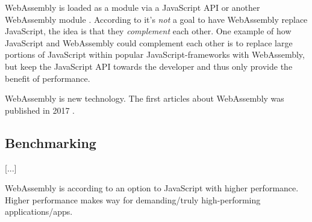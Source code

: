 WebAssembly is loaded as a module via a JavaScript API or another WebAssembly module \parencite{HaasRossbergSchuffTitzerHolmanGohmanWagnerZakaiBastien2017}. According to \textcite{Moller2018} it's \emph{not} a goal to have WebAssembly replace JavaScript, the idea is that they \emph{complement} each other. One example of how JavaScript and WebAssembly could complement each other is to replace large portions of JavaScript within popular JavaScript-frameworks with WebAssembly, but keep the JavaScript API towards the developer and thus only provide the benefit of performance.

WebAssembly is new technology. The first articles about WebAssembly was published in 2017 \parencite{HaasRossbergSchuffTitzerHolmanGohmanWagnerZakaiBastien2017,ReiserBlaser2017}.

\subsection{Benchmarking}

\parencite{LehmannPradel2018,MalleGiulianiKiesebergHolzinger2018}

[...]

WebAssembly is according to \textcite{HaasRossbergSchuffTitzerHolmanGohmanWagnerZakaiBastien2017} an option to JavaScript with higher performance. Higher performance makes way for demanding/truly high-performing applications/apps.
